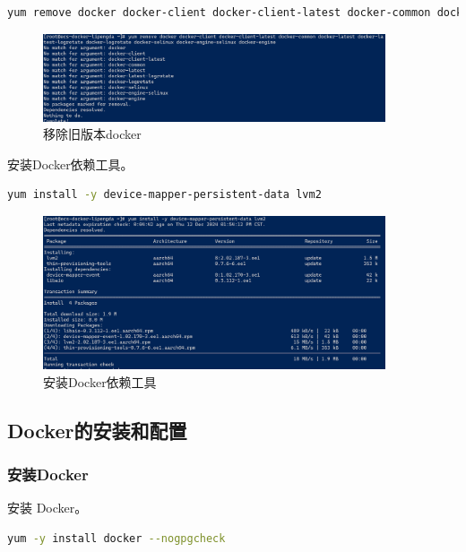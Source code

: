 \documentclass{article}
\begin{document}
\begin{lstlisting}[language=bash]
    yum remove docker docker-client docker-client-latest docker-common docker-latest docker-latest-logrotate docker-logrotate docker-selinux docker-engine-selinux docker-engine
\end{lstlisting}

\begin{figure}[H]
\centering
\includegraphics[width=0.9\textwidth]{img/1.4.10.png}
\caption{移除旧版本docker}
\end{figure}

安装Docker依赖工具。

\begin{lstlisting}[language=bash]
    yum install -y device-mapper-persistent-data lvm2
\end{lstlisting}

\begin{figure}[H]
\centering
\includegraphics[width=0.9\textwidth]{img/1.4.11.png}
\caption{安装Docker依赖工具}
\end{figure}

\subsection{Docker的安装和配置}

\subsubsection{安装Docker}

安装 Docker。

\begin{lstlisting}[language=bash]
    yum -y install docker --nogpgcheck
\end{lstlisting}
\end{document}
